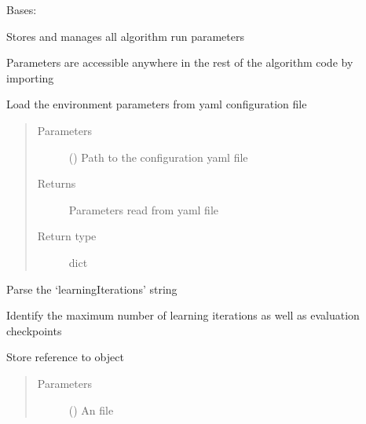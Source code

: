 \documentclass[letterpaper,10pt,english]{sphinxmanual}
\begin{document}
\begin{fulllineitems}
\label{\detokenize{eLCS:eLCS.Constants.Constants}}
Bases: 

Stores and manages all algorithm run parameters

Parameters are accessible anywhere in the rest of the algorithm code by importing 

\begin{fulllineitems}
\label{\detokenize{eLCS:eLCS.Constants.Constants.loadParameters}}
Load the environment parameters from yaml configuration file
\begin{quote}\begin{description}
\item[{Parameters}] \leavevmode
{} () \textendash{} Path to the configuration yaml file

\item[{Returns}] \leavevmode
Parameters read from yaml file

\item[{Return type}] \leavevmode
dict

\end{description}\end{quote}

\end{fulllineitems}


\begin{fulllineitems}
\label{\detokenize{eLCS:eLCS.Constants.Constants.parseIterations}}
Parse the ‘learningIterations’ string

Identify the maximum number of learning iterations as well as evaluation checkpoints

\end{fulllineitems}


\begin{fulllineitems}
\label{\detokenize{eLCS:eLCS.Constants.Constants.referenceEnv}}
Store reference to  object
\begin{quote}\begin{description}
\item[{Parameters}] \leavevmode
{} () \textendash{} An  file


\end{description}
\end{quote}
\end{fulllineitems}
\end{fulllineitems}
\end{document}
